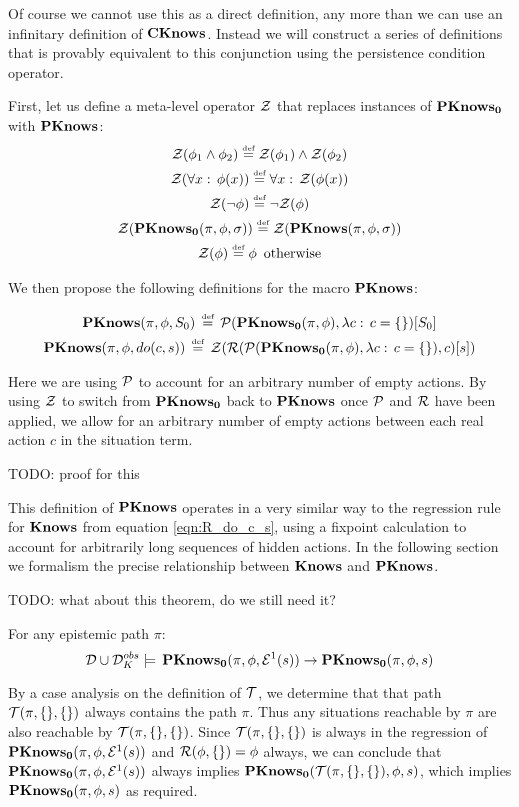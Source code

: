 Of course we cannot use this as a direct definition, any more than
we can use an infinitary definition of $\mathbf{CKnows}$. Instead we will
construct a series of definitions that is provably equivalent to this
conjunction using the persistence condition operator.

First, let us define a meta-level operator $\mathcal{Z}$ that replaces instances
of $\mathbf{PKnows_{0}}$ with $\mathbf{PKnows}$:\begin{gather*}
\mathcal{Z}(\phi_{1}\wedge\phi_{2})\stackrel{\mbox{\tiny def}}{=}\mathcal{Z}(\phi_{1})\wedge\mathcal{Z}(\phi_{2})\\
\mathcal{Z}(\forall x:\,\phi(x))\stackrel{\mbox{\tiny def}}{=}\forall x:\,\mathcal{Z}(\phi(x))\\
\mathcal{Z}(\neg\phi)\stackrel{\mbox{\tiny def}}{=}\neg\mathcal{Z}(\phi)\\
\mathcal{Z}(\mathbf{PKnows_{0}}(\pi,\phi,\sigma))\stackrel{\mbox{\tiny def}}{=}\mathcal{Z}(\mathbf{PKnows}(\pi,\phi,\sigma))\\
\mathcal{Z}(\phi)\stackrel{\mbox{\tiny def}}{=}\phi\,\,\,\mathrm{otherwise}\end{gather*}


We then propose the following definitions for the macro $\mathbf{PKnows}$:

\begin{gather*}
\mathbf{PKnows}(\pi,\phi,S_{0})\,\stackrel{\mbox{\tiny def}}{=}\,\mathcal{P}(\mathbf{PKnows_{0}}(\pi,\phi),\lambda c:\, c=\{\})[S_{0}]\\
\mathbf{PKnows}(\pi,\phi,do(c,s))\,\stackrel{\mbox{\tiny def}}{=}\,\mathcal{Z}(\mathcal{R}(\mathcal{P}(\mathbf{PKnows_{0}}(\pi,\phi),\lambda c:\, c=\{\}),c)[s])\end{gather*}


Here we are using $\mathcal{P}$ to account for an arbitrary number of empty
actions. By using $\mathcal{Z}$ to switch from $\mathbf{PKnows_{0}}$ back to $\mathbf{PKnows}$
once $\mathcal{P}$ and $\mathcal{R}$ have been applied, we allow for an arbitrary
number of empty actions between each real action $c$ in the situation
term.

TODO: proof for this

This definition of $\mathbf{PKnows}$ operates in a very similar way to the
regression rule for $\mathbf{Knows}$ from equation \eqref{eqn:R_do_c_s},
using a fixpoint calculation to account for arbitrarily long sequences
of hidden actions. In the following section we formalism the precise
relationship between $\mathbf{Knows}$ and $\mathbf{PKnows}$.

TODO: what about this theorem, do we still need it?

\begin{thm}
\label{thm:En_impl_En-1}For any epistemic path $\pi$: \[
\mathcal{D}\cup\mathcal{D}_{K}^{obs}\models\,\mathbf{PKnows_{0}}(\pi,\phi,\mathcal{E}^{1}(s))\rightarrow\mathbf{PKnows_{0}}(\pi,\phi,s)\]

\end{thm}
\begin{proofsketch}
By a case analysis on the definition of $\mathcal{T}$, we determine that
that path $\mathcal{T}(\pi,\{\},\{\})$ always contains the path $\pi$.
Thus any situations reachable by $\pi$ are also reachable by $\mathcal{T}(\pi,\{\},\{\})$.
Since $\mathcal{T}(\pi,\{\},\{\})$ is always in the regression of $\mathbf{PKnows_{0}}(\pi,\phi,\mathcal{E}^{1}(s))$
and $\mathcal{R}(\phi,\{\})=\phi$ always, we can conclude that $\mathbf{PKnows_{0}}(\pi,\phi,\mathcal{E}^{1}(s))$
always implies $\mathbf{PKnows_{0}}(\mathcal{T}(\pi,\{\},\{\}),\phi,s)$, which implies
$\mathbf{PKnows_{0}}(\pi,\phi,s)$ as required. 
\end{proofsketch}

